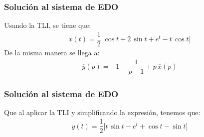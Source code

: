 \begin{frame}
\frametitle{Solución al sistema de EDO}
Usando la TLI, se tiene que:
\pause
\begin{align*}
x (t) = \dfrac{1}{2} \big[  \cos t + 2 \, \sin t +  e^{t} - t \, \cos t  \big]
\end{align*}
\pause
De la misma manera se llega a:
\pause
\begin{align*}
\overline{y} (p) = - 1 - \dfrac{1}{p - 1} + p \, \overline{x} (p)
\end{align*}
\end{frame}
\begin{frame}
\frametitle{Solución al sistema de EDO}
Que al aplicar la TLI y simplificando la expresión, tenemos que:
\pause
\begin{align*}
y (t)= \dfrac{1}{2} \big[  t \, \sin t - e^{t} + \cos t - \sin t  \big]
\end{align*}
\end{frame}



